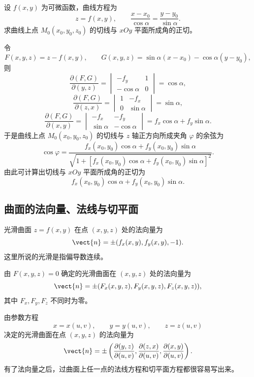 \begin{xexample}[21.1.1]
设 $f(x,y)$ 为可微函数，曲线方程为
\[
  z=f(x,y),\qquad \frac{x-x_0}{\cos\alpha}=\frac{y-y_0}{\sin\alpha}.
\]
求曲线上点 $M_0(x_0,y_0,z_0)$ 的切线与 $xOy$ 平面所成角的正切。
\end{xexample}
\begin{xsolution}
令
\[
  F(x,y,z)=z-f(x,y),\qquad
  G(x,y,z)=\sin\alpha(x-x_0)-\cos\alpha(y-y_0),
\]
则
\[
  \frac{\partial(F,G)}{\partial(y,z)}
  =\begin{vmatrix}-f_y&1\\-\cos\alpha&0\end{vmatrix}
  =\cos\alpha,
\]
\[
  \frac{\partial(F,G)}{\partial(z,x)}
  =\begin{vmatrix}1&-f_x\\0&\sin\alpha\end{vmatrix}
  =\sin\alpha,
\]
\[
  \frac{\partial(F,G)}{\partial(x,y)}
  =\begin{vmatrix}-f_x&-f_y\\\sin\alpha&-\cos\alpha\end{vmatrix}
  =f_x\cos\alpha+f_y\sin\alpha.
\]
于是曲线上点 $M_0(x_0,y_0,z_0)$ 的切线与 $z$ 轴正方向所成夹角 $\varphi$ 的余弦为
\[
  \cos\varphi=
  \frac{f_x(x_0,y_0)\cos\alpha+f_y(x_0,y_0)\sin\alpha}
  {\sqrt{1+[f_x(x_0,y_0)\cos\alpha+f_y(x_0,y_0)\sin\alpha]^2}}.
\]
由此可计算出切线与 $xOy$ 平面所成角的正切为
\[
  f_x(x_0,y_0)\cos\alpha+f_y(x_0,y_0)\sin\alpha.
\]
\end{xsolution}

\subsection{曲面的法向量、法线与切平面}

光滑曲面 $z=f(x,y)$ 在点 $(x,y,z)$ 处的法向量为
\[
  \vect{n}=\pm(f_x(x,y),f_y(x,y),-1).
\]
这里所说的光滑是指偏导数连续。

由 $F(x,y,z)=0$ 确定的光滑曲面在 $(x,y,z)$ 处的法向量为
\[
  \vect{n}=\pm(F_x(x,y,z),F_y(x,y,z),F_z(x,y,z)),
\]
其中 $F_x,F_y,F_z$ 不同时为零。

由参数方程
\[
  x=x(u,v),\qquad y=y(u,v),\qquad z=z(u,v)
\]
决定的光滑曲面在点 $(x,y,z)$ 的法向量为
\[
  \vect{n}=\pm\left(
  \frac{\partial(y,z)}{\partial(u,v)},
  \frac{\partial(z,x)}{\partial(u,v)},
  \frac{\partial(x,y)}{\partial(u,v)}
  \right).
\]
有了法向量之后，过曲面上任一点的法线方程和切平面方程都很容易写出来。

